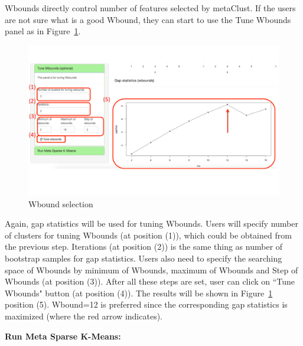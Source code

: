 \begin{steps}
Wbounds directly control number of features selected by metaClust.
If the users are not sure what is a good Wbound,
they can start to use the Tune Wbounds panel as in Figure~\ref{fig:metaClusttuneW}.
\begin{figure}[H]
\begin{center}
\includegraphics[scale=0.4]{./figure/metaClust/tuneW}
\caption{Wbound selection}
\label{fig:metaClusttuneW}
\end{center}
\end{figure}
Again,
gap statistics will be used for tuning Wbounds.
Users will specify number of clusters for tuning Wbounds (at position {\color{red} (1)}), which could be obtained from the previous step.
Iterations (at position {\color{red} (2)}) is the same thing as number of bootstrap samples for gap statistics.
Users also need to specify the searching space of Wbounds by minimum of Wbounds, maximum of Wbounds and Step of Wbounds (at position {\color{red} (3)}).
After all these steps are set,
user can click on ``Tune Wbounds" button (at position {\color{red} (4)}).
The results will be shown in Figure~\ref{fig:metaClusttuneW}  position {\color{red} (5)}.
Wbound=12 is preferred since the corresponding gap statistics is maximized (where the red arrow indicates).

\item \textbf{Run Meta Sparse K-Means:} 


\end{steps}
